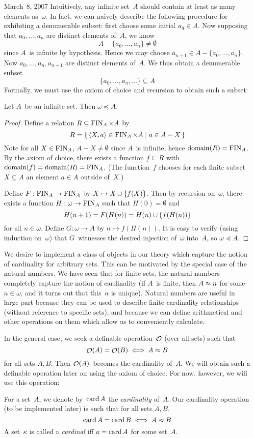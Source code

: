 \begin{lecture}{March~8, 2007}
Intuitively, any infinite set~\(A\) should contain at least as many elements as~\(\omega\). In fact, we can naively describe the following procedure for exhibiting a denumerable subset: first choose some initial \(a_0\in A\). Now supposing that \(a_0,\ldots,a_n\) are distinct elements of~\(A\), we know
\[A-\{a_0,\ldots,a_n\}\ne\emptyset\]
since \(A\)~is infinite by hypothesis. Hence we may choose \(a_{n+1}\in A-\{a_0,\ldots,a_n\}\). Now \(a_0,\ldots,a_n,a_{n+1}\) are distinct elements of~\(A\). We thus obtain a denumerable subset
\[\{a_0,\ldots,a_n,\ldots\}\subseteq A\]
Formally, we must use the axiom of choice and recursion to obtain such a subset:
\begin{thm}
Let \(A\)~be an infinite set. Then \(\omega\preceq A\).
\end{thm}
\begin{proof}
Define a relation \(R\subseteq\operatorname{FIN}_A\times A\) by
\[R=\{\,\langle{X},{a}\rangle\in \operatorname{FIN}_A\times A\mid a\in A-X\,\}\]
Note for all \(X\in\operatorname{FIN}_A\), \(A-X\ne\emptyset\) since \(A\)~is infinite, hence \(\operatorname{domain}(R)=\operatorname{FIN}_A\). By the axiom of choice, there exists a function \(f\subseteq R\) with \(\operatorname{domain}(f)=\operatorname{domain}(R)=\operatorname{FIN}_A\). (The function~\(f\) chooses for each finite subset \(X\subseteq A\) an element \(a\in A\) outside of~\(X\).)

Define \(F:\operatorname{FIN}_A\to\operatorname{FIN}_A\) by \(X\mapsto X\cup\{f(X)\}\). Then by recursion on~\(\omega\), there exists a function \(H:\omega\to\operatorname{FIN}_A\) such that \(H(0)=\emptyset\) and
\[H(n+1)=F(H(n))=H(n)\cup\{f(H(n))\}\]
for all \(n\in\omega\). Define \(G:\omega\to A\) by \(n\mapsto f(H(n))\). It is easy to verify (using induction on~\(\omega\)) that \(G\)~witnesses the desired injection of~\(\omega\) into~\(A\), so \(\omega\preceq A\).
\end{proof}

We desire to implement a class of objects in our theory which capture the notion of cardinality for arbitrary sets. This can be motivated by the special case of the natural numbers. We have seen that for finite sets, the natural numbers completely capture the notion of cardinality (if \(A\)~is finite, then \(A\approx n\) for some \(n\in\omega\), and it turns out that this~\(n\) is unique). Natural numbers are useful in large part because they can be used to describe finite cardinality relationships (without reference to specific sets), and because we can define arithmetical and other operations on them which allow us to conveniently calculate.

In the general case, we seek a definable operation~\(\mathop{\mathcal{O}}\nolimits\) (over all sets) such that
\[\mathop{\mathcal{O}}\nolimits(A)=\mathop{\mathcal{O}}\nolimits(B)\iff A\approx B\]
for all sets \(A,B\). Then \(\mathop{\mathcal{O}}\nolimits(A)\)~becomes the cardinality of~\(A\). We will obtain such a definable operation later on using the axiom of choice. For now, however, we will use this operation:
\begin{defn}
For a set~\(A\), we denote by~\(\operatorname{card}{A}\) the \emph{cardinality} of~\(A\). Our cardinality operation (to be implemented later) is such that for all sets \(A,B\),
\[\operatorname{card}{A}=\operatorname{card}{B}\iff A\approx B\]
A set~\(\kappa\) is called a \emph{cardinal} iff \(\kappa=\operatorname{card} A\) for some set~\(A\).
\end{defn}


\end{lecture}

